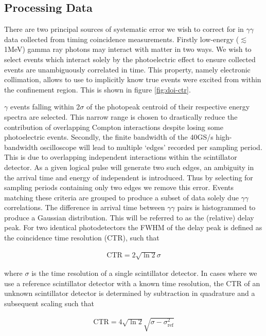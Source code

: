 \subsection{Processing Data}
There are two principal sources of systematic error we wish to correct for in $\gamma\gamma$ data collected from timing coincidence measurements. Firstly low-energy ($\lesssim$1MeV) gamma ray photons may interact with matter in two ways. We wish to select events which interact solely by the photoelectric effect to ensure collected events are unambiguously correlated in time. This property, namely electronic collimation, allows to use to implicitly know true events were excited from within the confinement region. This is shown in figure \ref{fig:doi-ctr}.

$\gamma$ events falling within $2\sigma$ of the photopeak centroid of their respective energy spectra are selected. This narrow range is chosen to drastically reduce the contribution of overlapping Compton interactions despite losing some photoelectric events. Secondly, the finite bandwidth of the 40GS/s high-bandwidth oscilloscope will lead to multiple `edges' recorded per sampling period. This is due to overlapping independent interactions within the scintillator detector. As a given logical pulse will generate two such edges, an ambiguity in the arrival time and energy of independent is introduced. Thus by selecting for sampling periods containing only two edges we remove this error. Events matching these criteria are grouped to produce a subset of data solely due $\gamma\gamma$ correlations. The difference in arrival time between $\gamma\gamma$ pairs is histogrammed to produce a Gaussian distribution. This will be referred to as the (relative) delay peak. For two identical photodetectors the FWHM of the delay peak is defined as the coincidence time resolution (CTR), such that

\begin{align}
\text{CTR} = 2\sqrt{\ln{2}}\sigma
\end{align}

where $\sigma$ is the time resolution of a single scintillator detector. In cases where we use a reference scintillator detector with a known time resolution, the CTR of an unknown scintillator detector is determined by subtraction in quadrature and a subsequent scaling such that

\begin{align}
\text{CTR} = 4\sqrt{\ln{2}}\sqrt{\sigma-\sigma_\textrm{ref}^2}
\end{align}

